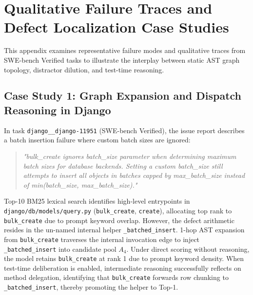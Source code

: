\documentclass[10pt]{article}
\begin{document}
\section{Qualitative Failure Traces and Defect Localization Case Studies}
\label{app:case_studies}

This appendix examines representative failure modes and qualitative traces from SWE-bench Verified tasks to illustrate the interplay between static AST graph topology, distractor dilution, and test-time reasoning.

\subsection{Case Study 1: Graph Expansion and Dispatch Reasoning in Django}
In task \texttt{django\_\_django-11951} (SWE-bench Verified), the issue report describes a batch insertion failure where custom batch sizes are ignored:
\begin{quote}
\small
\textit{"bulk\_create ignores batch\_size parameter when determining maximum batch sizes for database backends. Setting a custom batch\_size still attempts to insert all objects in batches capped by max\_batch\_size instead of min(batch\_size, max\_batch\_size)."}
\end{quote}
Top-10 BM25 lexical search identifies high-level entrypoints in \texttt{django/db/models/query.py} (\texttt{bulk\_create}, \texttt{create}), allocating top rank to \texttt{bulk\_create} due to prompt keyword overlap. However, the defect arithmetic resides in the un-named internal helper \texttt{\_batched\_insert}. 1-hop AST expansion from \texttt{bulk\_create} traverses the internal invocation edge to inject \texttt{\_batched\_insert} into candidate pool $A_4$. Under direct scoring without reasoning, the model retains \texttt{bulk\_create} at rank 1 due to prompt keyword density. When test-time deliberation is enabled, intermediate reasoning successfully reflects on method delegation, identifying that \texttt{bulk\_create} forwards row chunking to \texttt{\_batched\_insert}, thereby promoting the helper to Top-1.
\end{document}
